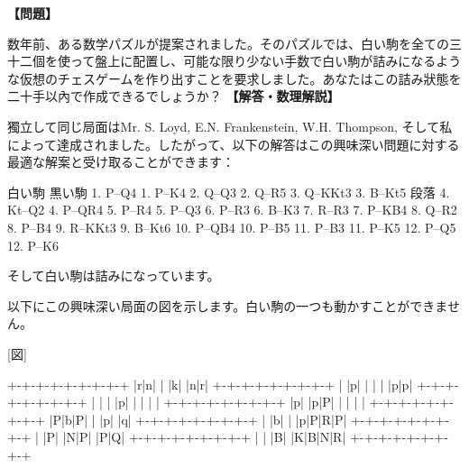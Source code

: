 \documentclass[10pt,a4paper,oneside,openany]{ltjsbook}
\begin{document}
\begin{tcolorbox}[colback=softblue,colframe=primaryblue,title=\textbf{第 349 問：stalemate （原題: STALEMATE.）},arc=2mm,boxrule=1pt,breakable]
\textbf{【問題】}\par\vspace{0.3em}
数年前、ある数学パズルが提案されました。そのパズルでは、白い駒を全ての三十二個を使って盤上に配置し、可能な限り少ない手数で白い駒が詰みになるような仮想のチェスゲームを作り出すことを要求しました。あなたはこの詰み狀態を二十手以內で作成できるでしょうか？
\tcblower
\textbf{【解答・数理解説】}\par\vspace{0.3em}
獨立して同じ局面はMr. S. Loyd, E.N. Frankenstein, W.H. Thompson, そして私によって達成されました。したがって、以下の解答はこの興味深い問題に対する最適な解案と受け取ることができます：

白い駒       黒い駒
1. P--Q4     1. P--K4
2. Q--Q3     2. Q--R5
3. Q--KKt3   3. B--Kt5 段落
4. Kt--Q2    4. P--QR4
5. P--R4     5. P--Q3
6. P--R3     6. B--K3
7. R--R3     7. P--KB4
8. Q--R2     8. P--B4
9. R--KKt3   9. B--Kt6
10. P--QB4   10. P--B5
11. P--B3    11. P--K5
12. P--Q5    12. P--K6

そして白い駒は詰みになっています。

以下にこの興味深い局面の図を示します。白い駒の一つも動かすことができません。

[図]

+-+-+-+-+-+-+-+-+
|r|n| | |k| |n|r|
+-+-+-+-+-+-+-+-+
| |p| | | | |p|p|
+-+-+-+-+-+-+-+-+
| | | |p| | | | |
+-+-+-+-+-+-+-+-+
|p| |p|P| | | | |
+-+-+-+-+-+-+-+-+
|P|b|P| | |p| |q|
+-+-+-+-+-+-+-+-+
| |b| | |p|P|R|P|
+-+-+-+-+-+-+-+-+
| |P| |N|P| |P|Q|
+-+-+-+-+-+-+-+-+
| | |B| |K|B|N|R|
+-+-+-+-+-+-+-+-+
\end{tcolorbox}
\end{document}
